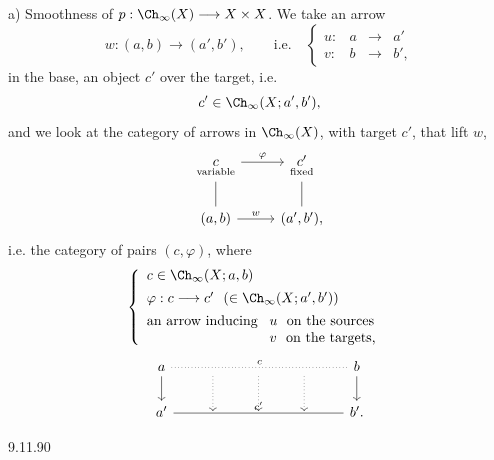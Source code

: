 a) Smoothness of $p : \Ch_{\infty}(X) \longrightarrow X \times X$. We take an arrow
\[
w : (a,b) \longrightarrow (a',b'), \qquad \text{i.e.} \quad \left\{ \begin{array}{lccc} u : & a & \longrightarrow & a' \\[1ex] v : & b & \longrightarrow & b', \end{array} \right.
\]
in the base, an object $c'$ over the target, i.e.
\[
c' \in \Ch_{\infty}(X; a', b'),
\]
and we look at the category of arrows in $\Ch_{\infty}(X)$, with target $c'$, that lift $w$,
\[
\begin{tikzcd}
\underset{\text{\scriptsize variable}}{c} \arrow[r, "\varphi"] \arrow[d, dash] & \underset{\text{\scriptsize fixed}}{c'} \arrow[d, dash] \\
(a,b) \arrow[r, "w"] & (a',b'),
\end{tikzcd}
\]
i.e. the category of pairs $(c,\varphi)$, where
\[
\left\{ \begin{array}{l}
c \in \Ch_{\infty}(X; a, b) \\[1ex]
\varphi : c \longrightarrow c' \ \ (\in \Ch_{\infty}(X; a', b')) \\[1ex]
\text{an arrow inducing } \begin{array}[t]{l} u \ \text{ on the sources} \\ v \ \text{ on the targets,} \end{array}
\end{array} \right.
\]
\[
\begin{tikzcd}
a \arrow[rrrr, dotted, dash, "c"] \arrow[d] & {} \arrow[d, dotted] & {} \arrow[d, dotted] & {} \arrow[d, dotted] & b \arrow[d] \\
a' \arrow[rrrr, dash, "c'"] & {} & {} & {} & b'.
\end{tikzcd}
\]

\begin{flushright}
{\footnotesize 9.11.90}
\end{flushright}

